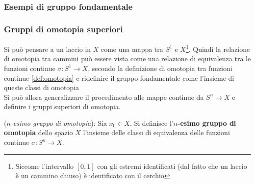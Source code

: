 \subsubsection{Esempi di gruppo fondamentale}
\subsubsection{Gruppi di omotopia superiori}
Si può pensare a un laccio in $X$ come una mappa tra $S^1$ e $X$\footnote{
Siccome l'intervallo $[0,1]$ con gli estremi identificati
(dal fatto che un laccio è un cammino chiuso) è identificato con il cerchio}.
Quindi la relazione di omotopia tra cammini può essere vista come una relazione
di equivalenza tra le funzioni continue $\sigma : S^1 \to X$, secondo la definizione
di omotopia tra funzioni continue \ref{def:omotopia} e ridefinire
il gruppo fondamentale come l'insieme di queste classi di omotopia\\

Si può allora generalizzare il procedimento alle mappe continue da $S^n \to X$ e
definire i gruppi superiori di omotopia.

\begin{definition}(\emph{$n$-esimo gruppo di omotopia}):
   Sia $x_0 \in X$. Si definisce l'\textbf{$n$-esimo gruppo di omotopia}
   dello spazio $X$ l'insieme delle classi di equivalenza delle funzioni continue
   $\sigma : S^n \to X$.
\end{definition}

